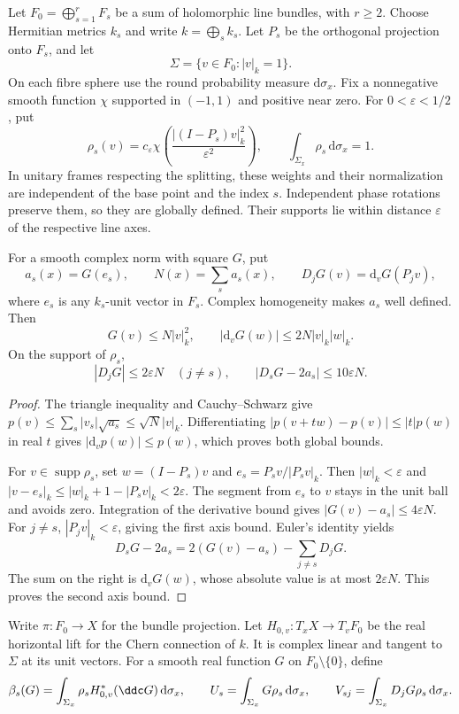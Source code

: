 Let $F_0=\bigoplus_{s=1}^rF_s$ be a sum of holomorphic line bundles, with $r\geq2$. Choose Hermitian metrics $k_s$ and write $k=\bigoplus_sk_s$. Let $P_s$ be the orthogonal projection onto $F_s$, and let
\[
 \Sigma=\{v\in F_0:|v|_k=1\}.
\]
On each fibre sphere use the round probability measure $\mathrm d\sigma_x$. Fix a nonnegative smooth function $\chi$ supported in $(-1,1)$ and positive near zero. For $0<\varepsilon<1/2$, put
\[
 \rho_s(v)=c_\varepsilon\chi\left(\frac{|(I-P_s)v|_k^2}{\varepsilon^2}\right),
 \qquad \int_{\Sigma_x}\rho_s\,\mathrm d\sigma_x=1.
\]
In unitary frames respecting the splitting, these weights and their normalization are independent of the base point and the index $s$. Independent phase rotations preserve them, so they are globally defined. Their supports lie within distance $\varepsilon$ of the respective line axes.

\begin{lemma}\label{lem:convex-norm-axis-estimates}
For a smooth complex norm with square $G$, put
\[
 a_s(x)=G(e_s),\qquad N(x)=\sum_sa_s(x),\qquad
 D_jG(v)=\mathrm d_vG(P_jv),
\]
where $e_s$ is any $k_s$-unit vector in $F_s$. Complex homogeneity makes $a_s$ well defined. Then
\[
 G(v)\leq N|v|_k^2,\qquad
 |\mathrm d_vG(w)|\leq2N|v|_k|w|_k.
\]
On the support of $\rho_s$,
\[
 |D_jG|\leq2\varepsilon N\quad(j\ne s),\qquad
 |D_sG-2a_s|\leq10\varepsilon N.
\]
\end{lemma}
\begin{proof}
The triangle inequality and Cauchy--Schwarz give
$p(v)\leq\sum_s|v_s|\sqrt{a_s}\leq\sqrt N|v|_k$.
Differentiating $|p(v+tw)-p(v)|\leq|t|p(w)$ in real $t$ gives
$|\mathrm d_vp(w)|\leq p(w)$, which proves both global bounds.

For $v\in\operatorname{supp}\rho_s$, set $w=(I-P_s)v$ and
$e_s=P_sv/|P_sv|_k$. Then $|w|_k<\varepsilon$ and
$|v-e_s|_k\leq|w|_k+1-|P_sv|_k<2\varepsilon$.
The segment from $e_s$ to $v$ stays in the unit ball and avoids zero. Integration of the derivative bound gives $|G(v)-a_s|\leq4\varepsilon N$. For $j\ne s$, $|P_jv|_k<\varepsilon$, giving the first axis bound. Euler's identity yields
\[
 D_sG-2a_s=2(G(v)-a_s)-\sum_{j\ne s}D_jG.
\]
The sum on the right is $\mathrm d_vG(w)$, whose absolute value is at most $2\varepsilon N$. This proves the second axis bound.
\end{proof}

Write $\pi:F_0\to X$ for the bundle projection. Let $H_{0,v}:T_xX\to T_vF_0$ be the real horizontal lift for the Chern connection of $k$. It is complex linear and tangent to $\Sigma$ at its unit vectors. For a smooth real function $G$ on $F_0\setminus\{0\}$, define
\[
 \beta_s(G)=\int_{\Sigma_x}\rho_s H_{0,v}^*(\ddc G)\,\mathrm d\sigma_x,
 \qquad U_s=\int_{\Sigma_x}G\rho_s\,\mathrm d\sigma_x,
 \qquad V_{sj}=\int_{\Sigma_x}D_jG\rho_s\,\mathrm d\sigma_x.
\]

